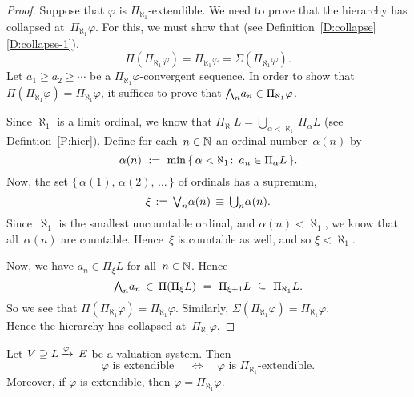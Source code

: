 \begin{proof}
Suppose that $\varphi$ is $\Pi_{\aleph_1}$-extendible.
We need to prove that the hierarchy has collapsed at~$\Pi_{\aleph_1}\varphi$.
For this, we must show that
(see Definition~\ref{D:collapse}\ref{D:collapse-1}),
\begin{equation*}
\Pi(\Pi_{\aleph_1}\varphi)
= \Pi_{\aleph_1}\varphi = \Sigma(\Pi_{\aleph_1}\varphi).
\end{equation*}
Let $a_1 \geq a_2 \geq \dotsb$ 
be a $\Pi_{\aleph_1}\varphi$-convergent sequence.
In order to show that $\Pi(\Pi_{\aleph_1}\varphi)=\Pi_{\aleph_1}\varphi$,
it suffices to prove that $\textstyle{\bigwedge}_n a_n \in \Pi_{\aleph_1}\varphi$.

Since $\aleph_1$ is a limit ordinal,
we know that $\Pi_{\aleph_1} L = \bigcup_{\alpha < \aleph_1} \Pi_\alpha L$
(see Defintion~\ref{P:hier}).
Define for each~$n\in\mathbb{N}$
an ordinal number~$\alpha(n)$ by
\begin{equation*}
\alpha(n)\ \eqdf\ 
\min\,\{\, \alpha<\aleph_1\colon\, a_n \in \Pi_\alpha L\,\}.
\end{equation*}
Now,
the set $\{\,\alpha(1),\,\alpha(2),\,\dotsc\,\}$ of
ordinals has a supremum,
\begin{equation*}
\xi\,:=\,\textstyle{\bigvee}_n\alpha(n)\,\equiv\,\textstyle{\bigcup_n}\alpha(n).
\end{equation*}
Since~$\aleph_1$ is the smallest uncountable ordinal,
and $\alpha(n)<\aleph_1$,
we know that all~$\alpha(n)$ are countable.
Hence~$\xi$ is countable as well,
and so $\xi<\aleph_1$.

Now, we have $a_n \in \Pi_{\xi} L$
for all~$n\in \mathbb{N}$.  Hence
\begin{equation*}
\textstyle{\bigwedge}_n a_n \,\in\, \Pi(\Pi_{\xi} L) 
\ =\ \Pi_{\xi+1} L
\ \subseteq\ \Pi_{\aleph_1} L.
\end{equation*}
So we see that $\Pi(\Pi_{\aleph_1}\varphi)=\Pi_{\aleph_1}\varphi$.
Similarly, $\Sigma(\Pi_{\aleph_1}\varphi)=\Pi_{\aleph_1}\varphi$.\\
Hence the hierarchy has collapsed at~$\Pi_{\aleph_1}\varphi$.
\end{proof}
%
%
%
\begin{cor}
\label{C:aleph1}
Let $V \supseteq L\,\smash{\xrightarrow{\varphi}\,E}$ be a valuation system. Then
\begin{equation*}
\varphi\text{ is extendible }
\quad\iff\quad
\varphi\text{ is $\Pi_{\aleph_1}$-extendible.}
\end{equation*}
Moreover,
if $\varphi$ is extendible,
then $\overline\varphi = \Pi_{\aleph_1}\varphi$.
\end{cor}
